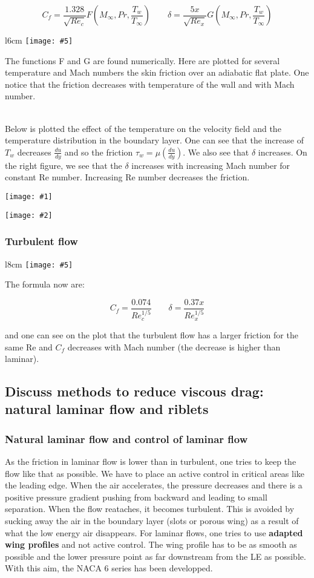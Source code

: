 \documentclass[british,french,11pt, a4paper, openany]{article}
\newcommand{\wrapfig}[6]{%
	\begin{wrapfigure}[#1]{#2}{#3cm}%
		\vspace{-5mm}%
		\texttt{[image: \#5]}%
		\captionof{figure}{}%
		\label{#6}%
	\end{wrapfigure}%
}
\newcommand{\minifig}[6]{
	\begin{center}%
		\begin{minipage}{#5\textwidth}%
			\texttt{[image: \#1]}%
			\captionof{figure}{}%
			\label{#1}%
		\end{minipage}%
		\begin{minipage}{#6\textwidth}%
			\texttt{[image: \#2]}%
			\captionof{figure}{}%
			\label{#2}%
		\end{minipage}%
	\end{center}
}
\begin{document}
\begin{equation}
C_f = \frac{1.328}{\sqrt{Re_c}}F \left( M_\infty , Pr, \frac{T_w}{T_\infty} \right)\qquad \delta = \frac{5x}{\sqrt{Re_x}}G \left( M_\infty , Pr, \frac{T_w}{T_\infty} \right)
\end{equation}

\wrapfig{8}{l}{6}{0.15}{ch4/1}{ch4/1}
The functions F and G are found numerically. Here are plotted for several temperature and Mach numbers the skin friction over an adiabatic flat plate. One notice that the friction decreases with temperature of the wall and with Mach number. 

\ \\ Below is plotted the effect of the temperature on the velocity field and the temperature distribution in the boundary layer. One can see that the increase of $T_w$ decreases $\frac{du}{dy}$ and so the friction $\tau _w = \mu (\frac{du}{dy})$. We also see that $\delta$ increases. On the right figure, we see that the $\delta$ increases with increasing Mach number for constant Re number. Increasing Re number decreases the friction.  

\minifig{ch4/2}{ch4/3}{0.15}{0.2}{0.49}{0.49}

\subsubsection{Turbulent flow}
\wrapfig{9}{l}{8}{0.15}{ch4/4}{ch4/4}
The formula now are:

\begin{equation}
C_f = \frac{0.074}{Re_c^{1/5}} \qquad \delta = \frac{0.37x}{Re_x^{1/5}}
\end{equation}

and one can see on the plot that the turbulent flow has a larger friction for the same Re and $C_f$ decreases with Mach number (the decrease is higher than laminar).

\subsection{Discuss methods to reduce viscous drag: natural laminar flow and riblets}

\subsubsection{Natural laminar flow and control of laminar flow}
As the friction in laminar flow is lower than in turbulent, one tries to keep the flow like that as possible. We have to place an active control in critical areas like the leading edge. When the air accelerates, the pressure decreases and there is a positive pressure gradient pushing from backward and leading to small separation. When the flow reataches, it becomes turbulent. This is avoided by sucking away the air in the boundary layer (slots or porous wing) as a result of what the low energy air disappears. For laminar flows, one tries to use \textbf{adapted wing profiles} and not active control. The wing profile has to be as smooth as possible and the lower pressure point as far downstream from the LE as possible. With this aim, the NACA 6 series has been developped. \\
\end{document}
